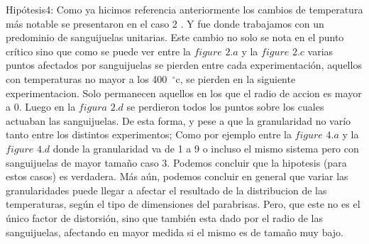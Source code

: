 Hipótesis4: Como ya hicimos referencia anteriormente los cambios de temperatura más notable se presentaron en el caso 2 . Y fue donde trabajamos con un predominio de sanguijuelas unitarias. Este cambio no solo se nota en el punto crítico sino que como se puede ver entre la $figure$ $2.a$ y la $figure$ $2.c$ varias puntos afectados por sanguijuelas se pierden entre cada experimentación, aquellos con temperaturas no mayor a los 400\hspace{-1.5mm}$\phantom{a}^{\circ}$c, se pierden en la siguiente experimentacion. Solo permanecen aquellos en los que el radio de accion es mayor a 0. Luego en la $figura$ $2.d$ se perdieron todos los puntos sobre los cuales actuaban las sanguijuelas. De esta forma, y pese a que la granularidad no varío tanto entre los distintos experimentos; Como por ejemplo entre la $figure$ $4.a$ y la $figure$ $4.d$ donde la granularidad va de 1 a 9 o  incluso el mismo sistema pero  con sanguijuelas de mayor tamaño caso 3. Podemos concluir que la hipotesis (para estos casos) es verdadera. Más aún, podemos concluir en general que variar las granularidades puede llegar a afectar el resultado de la distribucion de las temperaturas, según el tipo de dimensiones del parabrisas. Pero, que este no es el único factor de distorsión, sino que también esta dado por el radio de las sanguijuelas, afectando en mayor medida si el mismo es de tamaño muy bajo.  


